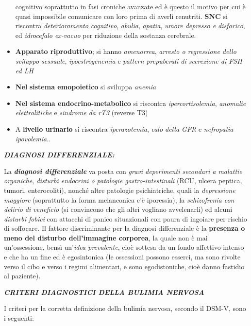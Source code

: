 \documentclass[]{article}
\begin{document}
\begin{itemize}
  cognitivo soprattutto in fasi croniche avanzate ed è questo il motivo
  per cui è quasi impossibile comunicare con loro prima di averli
  renutriti. \textbf{SNC} si riscontra \emph{deterioramento cognitivo},
  \emph{abulia}, \emph{apatia}, \emph{umore depresso e disforico}, ed
  \emph{idrocefalo ex-vacuo} per riduzione della sostanza cerebrale.
\item
  \textbf{Apparato riproduttivo}; si hanno \emph{amenorrea},
  \emph{arresto o regressione dello sviluppo sessuale},
  \emph{ipoestrogenemia} e \emph{pattern prepuberali di secrezione di
  FSH ed LH}
\item
  \textbf{Nel} \textbf{sistema emopoietico} si sviluppa \emph{anemia}
\item
  \textbf{Nel sistema endocrino-metabolico} si riscontra
  \emph{ipercortisolemia}, \emph{anomalie elettrolitiche} e
  \emph{sindrome da rT3} (reverse T3)
\item
  A \textbf{livello urinario} si riscontra \emph{iperazotemia},
  \emph{calo della GFR} e \emph{nefropatia ipovolemia}..
\end{itemize}

\textbf{\emph{DIAGNOSI DIFFERENZIALE:}}

La \textbf{\emph{diagnosi differenziale}} va posta con \emph{gravi
deperimenti secondari a malattie organiche}, \emph{disturbi endocrini o
patologie gastro-intestinali} (RCU, ulcera peptica, tumori,
enterocoliti), nonché altre patologie psichiatriche, quali la
\emph{depressione maggiore} (soprattutto la forma melanconica c'è
iporessia), la \emph{schizofrenia con delirio di veneficio} (si
convincono che gli altri vogliano avvelenarli) ed alcuni \emph{disturbi
fobici} con attacchi di panico situazionali con paura di ingoiare per
rischio di soffocare. Il fattore discriminante per la diagnosi
differenziale è la \textbf{presenza o meno del disturbo dell'immagine
corporea}, la quale non è mai un'ossessione, bensì un'\emph{idea
prevalente}, cioè sottesa da un fondo affettivo intenso e che ha un fine
ed è egosintonica (le ossessioni possono esserci, ma sono rivolte verso
il cibo e verso i regimi alimentari, e sono egodistoniche, cioè danno
fastidio al paziente).

\textbf{\emph{CRITERI DIAGNOSTICI DELLA BULIMIA NERVOSA}}

I criteri per la corretta definizione della bulimia nervosa, secondo il
DSM-V, sono i seguenti:
\end{document}
